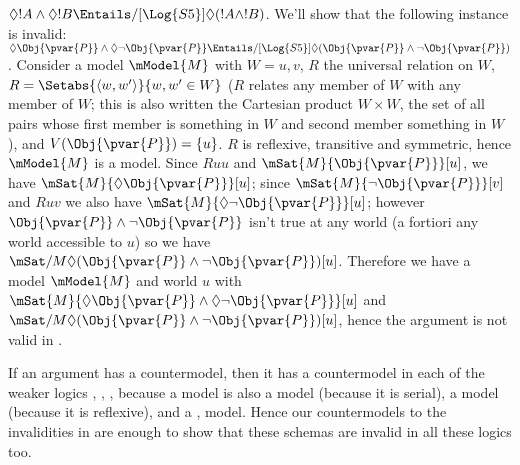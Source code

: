 \documentclass[../../../include/open-logic-section]{subfiles}
\begin{document}
\begin{prob}
\begin{ans}
    $\Diamond!A\land\Diamond!B\Entails/[\Log{S5}]\Diamond(!A\land!B)$.
    We'll show that the following instance is invalid: 
    $\Diamond\Obj{\pvar{P}}\land\Diamond\lnot\Obj{\pvar{P}} 
    \Entails/[\Log{S5}] \Diamond (\Obj{\pvar{P}} 
    \land \lnot\Obj{\pvar{P}})$.
    Consider a model $\mModel{M}$ with $W={u,v}$, $R$ the universal relation on 
    $W$, $R=\Setabs{\langle w,w'\rangle}{w,w'\in W}$ ($R$ relates
    any member of $W$ with any member of $W$; this is also written 
    the Cartesian product $W\times W$, the set of all pairs whose 
    first member is something in $W$ and second member something in $W$),
    and $V(\Obj{\pvar{P}})=\{u\}$. $R$ is reflexive, transitive and 
    symmetric, hence $\mModel{M}$ is a  model. Since $Ruu$ and 
    $\mSat{M}{\Obj{\pvar{P}}}[u]$, we have 
    $\mSat{M}{\Diamond\Obj{\pvar{P}}}[u]$; since
    $\mSat{M}{\lnot\Obj{\pvar{P}}}[v]$ and $Ruv$ we also have 
    $\mSat{M}{\Diamond\lnot\Obj{\pvar{P}}}[u]$; however 
    $\Obj{\pvar{P}}\land\lnot\Obj{\pvar{P}}$ isn't true at any world 
    (a fortiori any world accessible to $u$) so we have
     $\mSat/{M}{\Diamond (\Obj{\pvar{P}} \land \lnot\Obj{\pvar{P}})}[u]$.
    Therefore we have a  model $\mModel{M}$ and world $u$ with
     $\mSat{M}{\Diamond\Obj{\pvar{P}} 
     \land\Diamond\lnot\Obj{\pvar{P}}}[u]$ and  $\mSat/{M}{\Diamond 
    (\Obj{\pvar{P}} \land \lnot\Obj{\pvar{P}})}[u]$, hence the 
    argument is not valid in .

    If an argument has a  countermodel, then it has a 
    countermodel in each of the weaker logics , , ,
     because a  model is also a  model (because
    it is serial), a  model (because it is reflexive), and a 
    ,  model. Hence our  countermodels to 
    the invalidities in  are enough to show that 
    these schemas are invalid in all these logics too. 

    \end{ans}

\end{prob}
\end{document}
